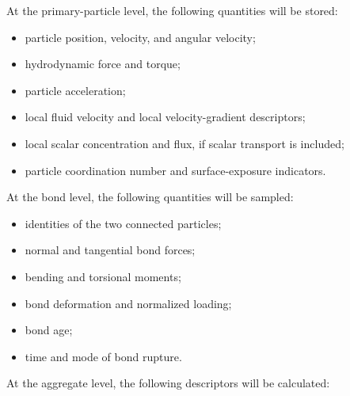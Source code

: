 \documentclass[11pt,a4paper,twoside]{scrartcl}
\begin{document}
At the primary-particle level, the following quantities will be stored:

\begin{itemize}
	\item particle position, velocity, and angular velocity;
	
	\item hydrodynamic force and torque;
	
	\item particle acceleration;
	
	\item local fluid velocity and local velocity-gradient descriptors;
	
	\item local scalar concentration and flux, if scalar transport is included;
	
	\item particle coordination number and surface-exposure indicators.	
\end{itemize}

At the bond level, the following quantities will be sampled:

\begin{itemize}
	\item identities of the two connected particles;
	
	\item normal and tangential bond forces;
	
	\item bending and torsional moments;
	
	\item bond deformation and normalized loading;
	
	\item bond age;
	
	\item time and mode of bond rupture.
\end{itemize}

At the aggregate level, the following descriptors will be calculated:
\end{document}
